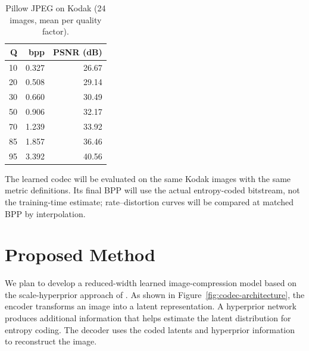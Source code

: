 \documentclass[11pt]{article}
\begin{document}
\begin{table}[htbp]
\centering
\caption{Pillow JPEG on Kodak (24 images, mean per quality factor).}
\label{tab:jpeg-kodak}
\begin{tabular}{@{}rrr@{}}
\toprule
\textbf{Q} & \textbf{bpp} & \textbf{PSNR (dB)} \\
\midrule
10 & 0.327 & 26.67 \\
20 & 0.508 & 29.14 \\
30 & 0.660 & 30.49 \\
50 & 0.906 & 32.17 \\
70 & 1.239 & 33.92 \\
85 & 1.857 & 36.46 \\
95 & 3.392 & 40.56 \\
\bottomrule
\end{tabular}
\end{table}

The learned codec will be evaluated on the same Kodak images with the same
metric definitions. Its final BPP will use the actual entropy-coded bitstream,
not the training-time estimate; rate--distortion curves will be compared at
matched BPP by interpolation.

\section{Proposed Method}

We plan to develop a reduced-width learned image-compression model
based on the scale-hyperprior approach of
\citet{balle2018scalehyperprior}. As shown in
Figure~\ref{fig:codec-architecture}, the encoder transforms an image
into a latent representation. A hyperprior network produces additional
information that helps estimate the latent distribution for entropy
coding. The decoder uses the coded latents and hyperprior information
to reconstruct the image.
\end{document}
